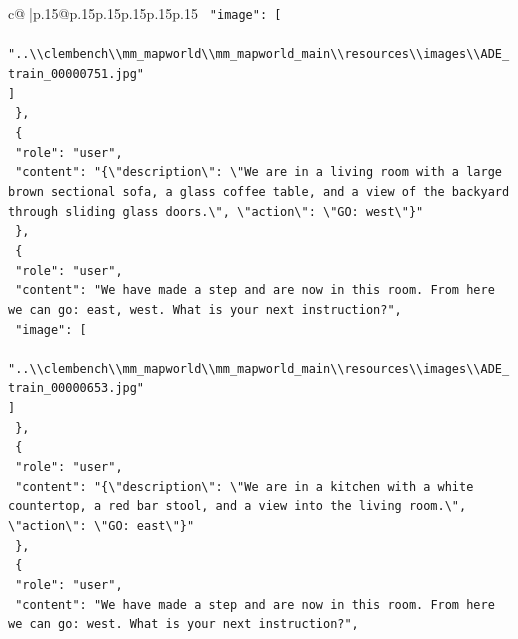 \documentclass{article}
\begin{document}
{\begin{supertabular}{c@{$\;$}|p{.15\linewidth}@{}p{.15\linewidth}p{.15\linewidth}p{.15\linewidth}p{.15\linewidth}p{.15\linewidth}}
{{{\texttt{    "image": {[}} \\
\texttt{      "..\textbackslash{}\textbackslash{}clembench\textbackslash{}\textbackslash{}mm\_mapworld\textbackslash{}\textbackslash{}mm\_mapworld\_main\textbackslash{}\textbackslash{}resources\textbackslash{}\textbackslash{}images\textbackslash{}\textbackslash{}ADE\_train\_00000751.jpg"} \\
\texttt{    {]}} \\
\texttt{  \},} \\
\texttt{  \{} \\
\texttt{    "role": "user",} \\
\texttt{    "content": "\{\textbackslash{}"description\textbackslash{}": \textbackslash{}"We are in a living room with a large brown sectional sofa, a glass coffee table, and a view of the backyard through sliding glass doors.\textbackslash{}", \textbackslash{}"action\textbackslash{}": \textbackslash{}"GO: west\textbackslash{}"\}"} \\
\texttt{  \},} \\
\texttt{  \{} \\
\texttt{    "role": "user",} \\
\texttt{    "content": "We have made a step and are now in this room. From here we can go: east, west. What is your next instruction?",} \\
\texttt{    "image": {[}} \\
\texttt{      "..\textbackslash{}\textbackslash{}clembench\textbackslash{}\textbackslash{}mm\_mapworld\textbackslash{}\textbackslash{}mm\_mapworld\_main\textbackslash{}\textbackslash{}resources\textbackslash{}\textbackslash{}images\textbackslash{}\textbackslash{}ADE\_train\_00000653.jpg"} \\
\texttt{    {]}} \\
\texttt{  \},} \\
\texttt{  \{} \\
\texttt{    "role": "user",} \\
\texttt{    "content": "\{\textbackslash{}"description\textbackslash{}": \textbackslash{}"We are in a kitchen with a white countertop, a red bar stool, and a view into the living room.\textbackslash{}", \textbackslash{}"action\textbackslash{}": \textbackslash{}"GO: east\textbackslash{}"\}"} \\
\texttt{  \},} \\
\texttt{  \{} \\
\texttt{    "role": "user",} \\
\texttt{    "content": "We have made a step and are now in this room. From here we can go: west. What is your next instruction?",} \\
}}}
\end{supertabular}}
\end{document}

